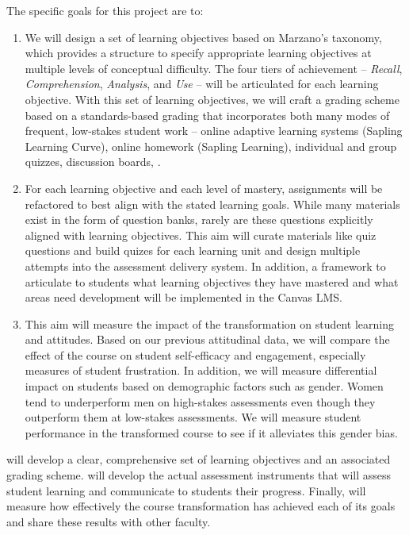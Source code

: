 \documentclass[10pt,letterpaper]{article}
\begin{document}
The specific goals for this project are to:
\begin{enumerate}[nosep,label=\textbf{\arabic*}.]
\item {} 
We will design a set of learning objectives  based on Marzano's taxonomy, which provides a structure to specify appropriate learning objectives at multiple levels of conceptual difficulty. The four tiers of achievement -- \textit{Recall}, \textit{Comprehension}, \textit{Analysis}, and \textit{Use} -- will be articulated for each learning objective. With this set of learning objectives, we will craft a grading scheme based on a standards-based grading that incorporates both many modes of frequent, low-stakes student work -- online adaptive learning systems (Sapling Learning Curve), online homework (Sapling Learning), individual and group quizzes, discussion boards, .

\item {}
For each learning objective and each level of mastery, assignments will be refactored to best align with the stated learning goals. While many materials exist in the form of question banks, rarely are these questions explicitly aligned with learning objectives. This aim will curate materials like quiz questions and build quizes for each learning unit and design multiple attempts into the assessment delivery system. In addition,  a framework to articulate to students what learning objectives they have mastered and what areas need development will be implemented in the Canvas LMS.

\item {}
This aim will measure the impact of the transformation on student learning and attitudes. Based on our previous attitudinal data, we will compare the effect of the course on student self-efficacy and engagement, especially measures of student frustration. In addition, we will measure differential impact on students based on demographic factors such as gender. Women tend to underperform men on high-stakes assessments even though they outperform them at low-stakes assessments. We will measure student performance in the transformed course to see if it alleviates this gender bias.
\end{enumerate}
 will develop a clear, comprehensive set of learning objectives and an associated grading scheme. 
 will develop the actual assessment instruments that will assess student learning and communicate to students their progress. Finally,  will measure how effectively the course transformation has achieved each of its goals and share these results with other faculty.
\end{document}
